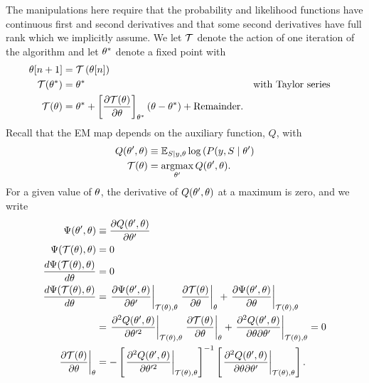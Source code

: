 The manipulations here require that the probability and likelihood
functions have continuous first and second derivatives and that some
second derivatives have full rank which we implicitly assume.  We let
$\EMmap$ denote the action of one iteration of the algorithm and let
${\theta^*}$ denote a fixed point with
\begin{align*}
  \ti{\parameters}{n+1} &= \EMmap\left( \ti{\parameters}{n} \right) \\
  \EMmap(\EMfixedPoint) &= \EMfixedPoint && \text{with Taylor series} \\
  \EMmap(\parameters) &= \EMfixedPoint + \left[ \frac{\partial
                 \EMmap(\parameters)}{\partial \parameters} \right]_{\EMfixedPoint} (\parameters - \EMfixedPoint) + \text{Remainder}.
\end{align*}
Recall that the EM map depends on the auxiliary function, $Q$, with
\begin{align*}
  Q(\NewParameters, \OldParameters) &\equiv \EV_{S \given y,\OldParameters} \log\left(P(y,S \given
  \NewParameters \right) \\
  \EMmap(\OldParameters) &= \argmax_{\NewParameters} Q(\NewParameters, \OldParameters). 
\end{align*}
For a given value of $\theta$, the derivative of $Q(\theta',
\theta)$ at a maximum is zero, and we write
\begin{align}
  \nonumber
  \Psi(\NewParameters,\OldParameters)
  &\equiv \frac{\partial Q(\NewParameters,
    \OldParameters)}{\partial \NewParameters} \\
  \nonumber
  \Psi(\EMmap(\OldParameters), \OldParameters)
  &= 0 \\
  \nonumber
  \frac{d\Psi(\EMmap(\OldParameters), \OldParameters)}{d \OldParameters}
  &= 0 \\
  \nonumber
  \frac{d\Psi(\EMmap(\OldParameters), \OldParameters)}{d \OldParameters}
  &= \left. \frac{\partial \Psi(\NewParameters, \OldParameters)}{\partial \NewParameters}
    \right|_{\EMmap(\OldParameters), \OldParameters} \left.\frac{\partial
    \EMmap(\parameters)}{\partial \parameters} \right|_{\OldParameters} +
    \left. \frac{\partial \Psi(\NewParameters, \OldParameters)}{\partial \OldParameters}
    \right|_{\EMmap(\OldParameters), \OldParameters} \\
  \nonumber
  &= \left. \frac{\partial^2 Q(\NewParameters, \OldParameters)}{\partial \NewParameters^2}
    \right|_{\EMmap(\OldParameters), \OldParameters} \left.\frac{\partial
    \EMmap(\parameters)}{\partial \parameters} \right|_{\OldParameters} +
    \left. \frac{\partial^2 Q(\NewParameters, \OldParameters)}{\partial \OldParameters
    \partial \NewParameters} \right|_{\EMmap(\OldParameters), \OldParameters} =0 \\
  \label{eq:two_second_derivatives}
  \left.\frac{\partial \EMmap(\parameters)}{\partial \parameters}
  \right|_{\OldParameters}
  &= - \left[ \left. \frac{\partial^2 Q(\NewParameters,  \OldParameters)}{\partial
    \NewParameters^2} \right|_{\EMmap(\OldParameters), \OldParameters} \right]^{-1} \left[
    \left. \frac{\partial^2 Q(\NewParameters, \OldParameters)}{\partial \OldParameters
    \partial \NewParameters} \right|_{\EMmap(\OldParameters), \OldParameters} \right].
\end{align}

